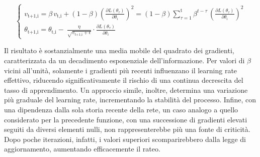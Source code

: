 \begin{itemize}
            \begin{equation}
                \begin{cases}
                    v_{\text{t+1,i}} = \displaystyle \beta \, v_{\text{t,i}}  + (1 - \beta) \left(\frac{\partial L(\theta_{\tau})}{\partial \theta_{i}}\right)^{2} = (1 - \beta) \sum_{\tau=1}^{\text{t}} \beta^{t-\tau} \, \left(\frac{\partial L(\theta_{\tau})}{\partial \theta_{i}}\right)^{2} \\[0.40cm]
                    \theta_{\text{t+1,i}} = \displaystyle \theta_{\text{t,i}} - \ \frac{\eta}{\sqrt{v_{\text{t+1,i}} + \epsilon}} \cdot \frac{\partial L(\theta_{\tau})}{\partial \theta_{i}}
                \end{cases}
                \label{eq:RMSProp}
            \end{equation}

        Il risultato è sostanzialmente una media mobile del quadrato dei gradienti, caratterizzata da un decadimento esponenziale dell'informazione. Per valori di $\beta$ vicini all'unità, solamente i gradienti più recenti influenzano il learning rate effettivo, riducendo significativamente il rischio di una continua decrescita del tasso di apprendimento. Un approccio simile, inoltre, determina una variazione più graduale del learning rate, incrementando la stabilità del processo. Infine, con una dipendenza dalla sola storia recente della rete, un caso analogo a quello considerato per la precedente funzione, con una successione di gradienti elevati seguiti da diversi elementi nulli, non rappresenterebbe più una fonte di criticità. Dopo poche iterazioni, infatti, i valori superiori scomparirebbero dalla legge di aggiornamento, aumentando efficacemente il rateo.


\end{itemize}
